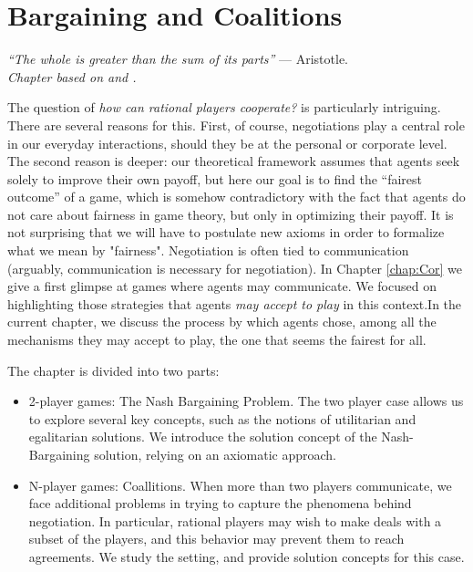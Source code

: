 

\ifx \globalmark \undefined %
	
\else
\fi




\chapter{Bargaining and Coalitions}
{\large{\itshape
``The whole is greater than the sum of its parts''} --- Aristotle.\\
}
\label{chap:Bar}
{\small{\itshape
Chapter based on \cite[pages 370 - 390 and 417 - 444]{MyGTAO} and \cite[Chapter 12]{ShLeMSAG}.}\\
}


The question of \emph{how can rational players cooperate?} is particularly intriguing. There are several reasons for this. First, of course, negotiations play a central role in our everyday interactions, should they be at the personal or corporate level. The second reason is deeper: our theoretical framework assumes that agents seek solely to improve their own payoff, but here our goal is to find the ``fairest outcome'' of a game, which is somehow contradictory with the fact that agents do not care about fairness in game theory, but only in optimizing their payoff.  It is not surprising that we will have to postulate new axioms in order to formalize what we mean by "fairness".
Negotiation is often tied to communication (arguably, communication is necessary for negotiation). In Chapter \ref{chap:Cor} we give a first glimpse at games where agents may communicate. We focused on highlighting those strategies that agents \emph{may accept to play} in this context.In the current chapter, we discuss the process by which agents chose, among all the mechanisms they may accept to play, the one that seems the fairest for all.

The chapter is divided into two parts:
\begin{itemize}
\item 2-player games: The Nash Bargaining Problem. The two player case allows us to explore several key concepts, such as the notions of utilitarian and egalitarian solutions. We introduce the solution concept of the Nash-Bargaining solution, relying on an axiomatic approach.
\item N-player games: Coallitions. When more than two players communicate, we face additional problems in trying to capture the phenomena behind negotiation. In particular, rational players may wish to make deals with a subset of the players, and this behavior may prevent them to reach agreements. We study the setting, and provide solution concepts for this case.
\end{itemize}




